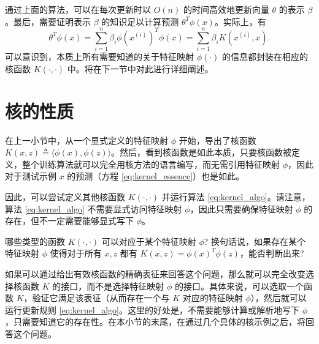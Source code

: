 通过上面的算法，可以在每次更新时以 $O(n)$ 的时间高效地更新向量 $\theta$ 的表示 $\beta$。最后，需要证明表示 $\beta$ 的知识足以计算预测 $\theta^T \phi(x)$。实际上，有
\begin{equation}
    \theta^T \phi(x) = \sum_{i=1}^n \beta_i \phi(x^{(i)})^T \phi(x) = \sum_{i=1}^n \beta_i K(x^{(i)}, x).
    \label{eq:kernel_essence}
\end{equation}
可以意识到，本质上所有需要知道的关于特征映射 $\phi(\cdot)$ 的信息都封装在相应的核函数 $K(\cdot, \cdot)$ 中。将在下一节中对此进行详细阐述。

\section{核的性质}

在上一小节中，从一个显式定义的特征映射 $\phi$ 开始，导出了核函数 $K(x, z) \triangleq \langle \phi(x), \phi(z) \rangle$。然后，看到核函数是如此本质，只要核函数被定义，整个训练算法就可以完全用核方法的语言编写，而无需引用特征映射 $\phi$，因此对于测试示例 $x$ 的预测（方程 \eqref{eq:kernel_essence}）也是如此。

因此，可以尝试定义其他核函数 $K(\cdot, \cdot)$ 并运行算法 \eqref{eq:kernel_algo}。请注意，算法 \eqref{eq:kernel_algo} 不需要显式访问特征映射 $\phi$，因此只需要确保特征映射 $\phi$ 的存在，但不一定需要能够显式写下 $\phi$。

哪些类型的函数 $K(\cdot, \cdot)$ 可以对应于某个特征映射 $\phi$? 换句话说，如果存在某个特征映射 $\phi$ 使得对于所有 $x, z$ 都有 $K(x, z) = \phi(x)^T \phi(z)$，能否判断出来?

如果可以通过给出有效核函数的精确表征来回答这个问题，那么就可以完全改变选择核函数 $K$ 的接口，而不是选择特征映射 $\phi$ 的接口。具体来说，可以选取一个函数 $K$，验证它满足该表征（从而存在一个与 $K$ 对应的特征映射 $\phi$），然后就可以运行更新规则 \eqref{eq:kernel_algo}。这里的好处是，不需要能够计算或解析地写下 $\phi$，只需要知道它的存在性。在本小节的末尾，在通过几个具体的核示例之后，将回答这个问题。

